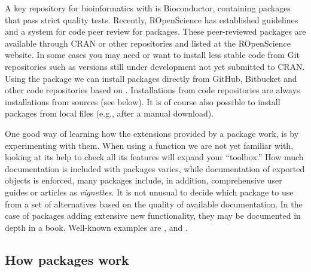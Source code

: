 \documentclass[krantz2]{krantz}\usepackage{knitr}
\begin{document}
A key repository for bioinformatics with \Rlang is Bioconductor, containing packages that pass strict quality tests. Recently, ROpenScience has established guidelines and a system for code peer review for packages. These peer-reviewed packages are available through CRAN or other repositories and listed at the ROpenScience website. In some cases you may need or want to install less stable code from Git repositories such as versions still under development not yet submitted to CRAN. Using the package  we can install packages directly from GitHub, Bitbucket and other code repositories based on . Installations from code repositories are always installations from sources (see below). It is of course also possible to install packages from local files (e.g.,  after a manual download).

One good way of learning how the extensions provided by a package work, is by experimenting with them. When using a function we are not yet familiar with, looking at its help to check all its features will expand your ``toolbox.'' How much documentation is included with packages varies, while documentation of exported objects is enforced, many packages include, in addition, comprehensive user guides or articles as \emph{vignettes}. It is not unusual to decide which package to use from a set of alternatives based on the quality of available documentation. In the case of packages adding extensive new functionality, they may be documented in depth in a book. Well-known examples are  \autocite{Pinheiro2000},  \autocite{Sarkar2008} and  \autocite{Wickham2016}.

\subsection{How packages work}
\end{document}
